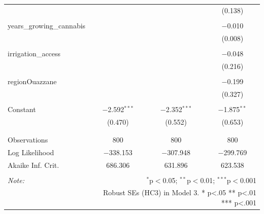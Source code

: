 \begin{table}[!htbp]
\begin{tabular}{@{\extracolsep{5pt}}lccc}
  &  &  & (0.138) \\ 
  & & & \\ 
 years\_growing\_cannabis &  &  & $-$0.010 \\ 
  &  &  & (0.008) \\ 
  & & & \\ 
 irrigation\_access &  &  & $-$0.048 \\ 
  &  &  & (0.216) \\ 
  & & & \\ 
 regionOuazzane &  &  & $-$0.199 \\ 
  &  &  & (0.327) \\ 
  & & & \\ 
 Constant & $-$2.592$^{***}$ & $-$2.352$^{***}$ & $-$1.875$^{**}$ \\ 
  & (0.470) & (0.552) & (0.653) \\ 
  & & & \\ 
\hline \\[-1.8ex] 
Observations & 800 & 800 & 800 \\ 
Log Likelihood & $-$338.153 & $-$307.948 & $-$299.769 \\ 
Akaike Inf. Crit. & 686.306 & 631.896 & 623.538 \\ 
\hline 
\hline \\[-1.8ex] 
\textit{Note:}  & \multicolumn{3}{r}{$^{*}$p$<$0.05; $^{**}$p$<$0.01; $^{***}$p$<$0.001} \\ 
 & \multicolumn{3}{r}{Robust SEs (HC3) in Model 3. * p<.05  ** p<.01  *** p<.001} \\ 
\end{tabular} 
\end{table} 
